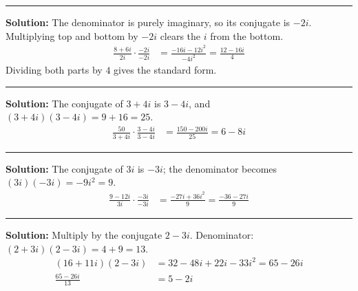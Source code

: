 \documentclass[12pt]{article}
\begin{document}



\vspace{0.3cm}
\noindent\rule{\linewidth}{0.4pt}
\vspace{0.2cm}


\textbf{Solution:} The denominator is purely imaginary, so its conjugate is
$-2i$. Multiplying top and bottom by $-2i$ clears the $i$ from the bottom.
\begin{align*}
  \frac{8 + 6i}{2i} \cdot \frac{-2i}{-2i}
    &= \frac{-16i - 12i^2}{-4i^2} = \frac{12 - 16i}{4}
\end{align*}
Dividing both parts by $4$ gives the standard form. 

\vspace{0.15cm}
\noindent\rule{\linewidth}{0.2pt}


\textbf{Solution:} The conjugate of $3 + 4i$ is $3 - 4i$, and
$(3 + 4i)(3 - 4i) = 9 + 16 = 25$.
\begin{align*}
  \frac{50}{3 + 4i} \cdot \frac{3 - 4i}{3 - 4i}
    &= \frac{150 - 200i}{25} = 6 - 8i
\end{align*}

\vspace{0.15cm}
\noindent\rule{\linewidth}{0.2pt}


\textbf{Solution:} The conjugate of $3i$ is $-3i$; the denominator becomes
$(3i)(-3i) = -9i^2 = 9$.
\begin{align*}
  \frac{9 - 12i}{3i} \cdot \frac{-3i}{-3i}
    &= \frac{-27i + 36i^2}{9} = \frac{-36 - 27i}{9}
\end{align*}

\vspace{0.15cm}
\noindent\rule{\linewidth}{0.2pt}


\textbf{Solution:} Multiply by the conjugate $2 - 3i$. Denominator:
$(2 + 3i)(2 - 3i) = 4 + 9 = 13$.
\begin{align*}
  (16 + 11i)(2 - 3i) &= 32 - 48i + 22i - 33i^2 = 65 - 26i \\
  \frac{65 - 26i}{13} &= 5 - 2i
\end{align*}
\end{document}

